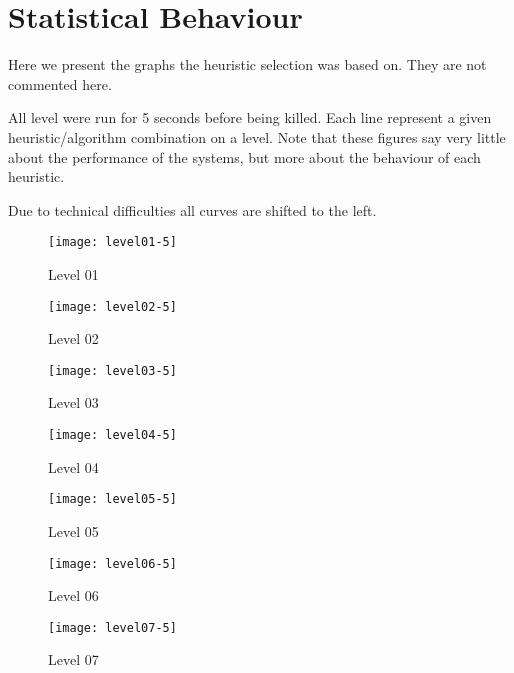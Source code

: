 \chapter{Statistical Behaviour}
\label{app:results}
Here we present the graphs the heuristic selection was based on. They
are not commented here.

All level were run for 5 seconds before being killed. Each line
represent a given heuristic/algorithm combination on a level. Note
that these figures say very little about the performance of the
systems, but more about the behaviour of each heuristic.


Due to technical difficulties all \astar curves are shifted to the
left.

\begin{figure}
  \centering
  \texttt{[image: level01-5]}
  \caption{Level 01}
  \label{fig:level01-stats}
\end{figure}
 
\begin{figure}
  \centering
  \texttt{[image: level02-5]}
  \caption{Level 02}
  \label{fig:level02-stats}
\end{figure}

\begin{figure}
  \centering
  \texttt{[image: level03-5]}
  \caption{Level 03}
  \label{fig:level03-stats}
\end{figure}
 
\begin{figure}
  \centering
  \texttt{[image: level04-5]}
  \caption{Level 04}
  \label{fig:level04-stats}
\end{figure}

\begin{figure}
  \centering
  \texttt{[image: level05-5]}
  \caption{Level 05}
  \label{fig:level05-stats}
\end{figure}
 
\begin{figure}
  \centering
  \texttt{[image: level06-5]}
  \caption{Level 06}
  \label{fig:level06-stats}
\end{figure}

\begin{figure}
  \centering
  \texttt{[image: level07-5]}
  \caption{Level 07}
  \label{fig:level07-stats}
\end{figure}
 
